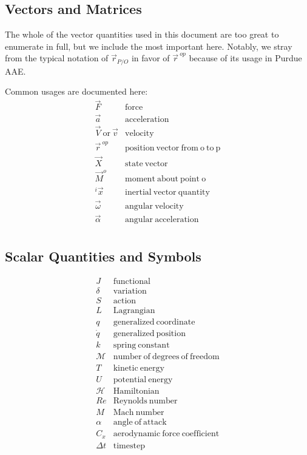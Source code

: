 \documentclass[12pt]{report}
\begin{document}

\subsection*{Vectors and Matrices}
The whole of the vector quantities used in this document are too great to enumerate in full, but we include the most important here. Notably, we stray from the typical notation of $\vec{r}_{P/O}$ in favor of $\vec{r}^{\ op}$ because of its usage in Purdue AAE.

Common usages are documented here:
$$\begin{array}{ll}
     \vec{F}&  \mathrm{force}\\
     \vec{a}& \mathrm{acceleration}\\
     \vec{V} \ \mathrm {or} \ \vec{v}& \mathrm{velocity}\\
      \vec{r}^{\ op}& \mathrm{position \ vector \ from \ o \ to \ p}\\ 
      \vec{X}& \mathrm{state\ vector}\\
      \vec{M}^{o}& \mathrm{moment\ about\ point\ o}\\
      {}^i\vec{x}& \mathrm{inertial\ vector\ quantity}\\
      \vec{\omega}&\mathrm{angular \ velocity}\\
       \vec{\alpha}& \mathrm{angular \ acceleration}\\
\end{array}$$
\subsection*{Scalar Quantities and Symbols}
$$\begin{array}{ll}
     J&  \mathrm{functional}\\
     \delta&\mathrm{variation}\\
      S& \mathrm{action}\\
      L & \mathrm{Lagrangian}\\
              q& \mathrm{generalized \ coordinate}\\
         \dot{q}& \mathrm{generalized \ position}\\
       k& \mathrm{spring \ constant}\\
        \mathcal{M}& \mathrm{number\ of\ degrees\ of\ freedom}\\
     T& \mathrm{kinetic \ energy}\\
      U& \mathrm{potential \ energy}\\
    \mathcal{H}& \mathrm{Hamiltonian}\\
     Re& \mathrm{Reynolds\ number}\\
     M & \mathrm{Mach \ number}\\
      \alpha & \mathrm{angle \ of \ attack}\\
       C_x& \mathrm{aerodynamic \ force \ coefficient}\\
        \Delta t& \mathrm{timestep}\\
\end{array}$$
\end{document}
